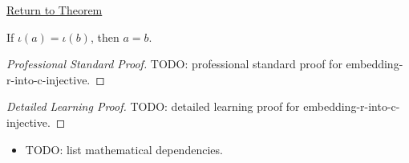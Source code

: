 \newpage
{}
\label{prf:embedding-r-into-c-injective}

\begin{remark*}[Return]
\hyperref[thm:embedding-r-into-c-injective]{Return to Theorem}
\end{remark*}

\begin{theorem*}
If \(\iota(a)=\iota(b)\), then \(a=b\).
\end{theorem*}

\begin{proof}[Professional Standard Proof]
\LRAProofBodyStart
TODO: professional standard proof for embedding-r-into-c-injective.
\end{proof}

\begin{proof}[Detailed Learning Proof]
\LRAProofBodyStart
TODO: detailed learning proof for embedding-r-into-c-injective.
\end{proof}

\begin{remark*}
\end{remark*}

\begin{dependencies}
\begin{itemize}
  \item TODO: list mathematical dependencies.
\end{itemize}
\end{dependencies}

\clearpage
